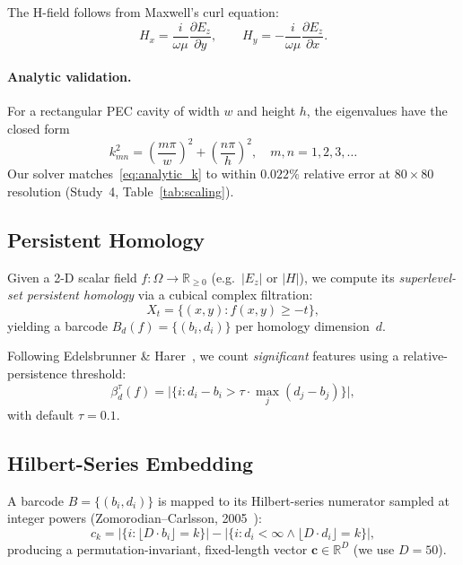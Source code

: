 \documentclass[11pt,twocolumn]{article}
\begin{document}
The H-field follows from Maxwell's curl equation:
\begin{equation}
H_x = \frac{i}{\omega\mu}\frac{\partial E_z}{\partial y}, \qquad
H_y = -\frac{i}{\omega\mu}\frac{\partial E_z}{\partial x}.
\end{equation}

\paragraph{Analytic validation.}
For a rectangular PEC cavity of width $w$ and height $h$, the eigenvalues
have the closed form
\begin{equation}
k_{mn}^2 = \left(\frac{m\pi}{w}\right)^2 + \left(\frac{n\pi}{h}\right)^2,
\quad m,n = 1,2,3,\ldots
\label{eq:analytic_k}
\end{equation}
Our solver matches~\eqref{eq:analytic_k} to within $0.022\%$ relative error
at $80 \times 80$ resolution (Study~4, Table~\ref{tab:scaling}).

\subsection{Persistent Homology}

Given a 2-D scalar field $f : \Omega \to \mathbb{R}_{\geq 0}$ (e.g.\
$|E_z|$ or $|H|$), we compute its \emph{superlevel-set persistent
homology} via a cubical complex filtration:
\[
X_t = \{(x,y) : f(x,y) \geq -t\},
\]
yielding a barcode $B_d(f) = \{(b_i, d_i)\}$ per homology dimension~$d$.

Following Edelsbrunner \& Harer~\cite{edelsbrunner2010}, we count
\emph{significant} features using a relative-persistence threshold:
\begin{equation}
\beta_d^\tau(f) = \bigl|\{i : d_i - b_i > \tau \cdot \max_j(d_j - b_j)\}\bigr|,
\label{eq:betti_threshold}
\end{equation}
with default $\tau = 0.1$.

\subsection{Hilbert-Series Embedding}

A barcode $B = \{(b_i, d_i)\}$ is mapped to its Hilbert-series numerator
sampled at integer powers (Zomorodian--Carlsson, 2005~\cite{zomorodian2005}):
\begin{equation}
c_k = |\{i : \lfloor D \cdot b_i \rfloor = k\}|
    - |\{i : d_i < \infty \wedge \lfloor D \cdot d_i \rfloor = k\}|,
\label{eq:hilbert}
\end{equation}
producing a permutation-invariant, fixed-length vector $\mathbf{c} \in
\mathbb{R}^D$ (we use $D=50$).
\end{document}
